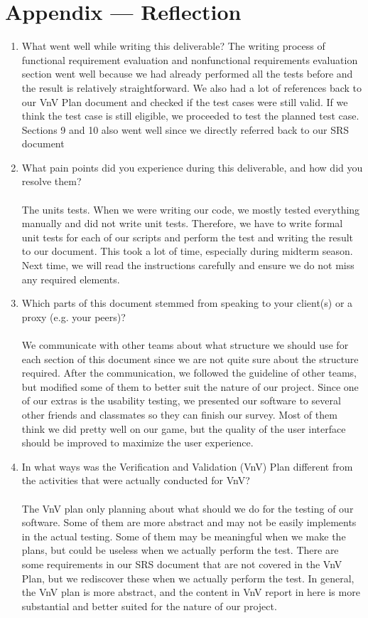 \documentclass[12pt, titlepage]{article}
\begin{document}
\newpage{}





\section{Appendix --- Reflection}

\begin{enumerate}
  \item What went well while writing this deliverable? The writing process of functional requirement evaluation and nonfunctional requirements evaluation section went well because we had already performed all the tests before and the result is relatively straightforward. We also had a lot of references back to our VnV Plan document and checked if the test cases were still valid. If we think the test case is still eligible, we proceeded to test the planned test case. Sections 9 and 10 also went well since we directly referred back to our SRS document
  \item What pain points did you experience during this deliverable, and how did you resolve them?\\\\
  The units tests. When we were writing our code, we mostly tested everything manually and did not write unit tests. Therefore, we have to write formal unit tests for each of our scripts and perform the test and writing the result to our document. This took a lot of time, especially during midterm season. Next time, we will read the instructions carefully and ensure we do not miss any required elements.
  \item Which parts of this document stemmed from speaking to your client(s) or a proxy (e.g. your peers)?\\\\
  We communicate with other teams about what structure we should use for each section of this document since we are not quite sure about the structure required. After the communication, we followed the guideline of other teams, but modified some of them to better suit the nature of our project. Since one of our extras is the usability testing, we presented our software to several other friends and classmates so they can finish our survey. Most of them think we did pretty well on our game, but the quality of the user interface should be improved to maximize the user experience.
  \item In what ways was the Verification and Validation (VnV) Plan different from the activities that were actually conducted for VnV?\\\\
  The VnV plan only planning about what should we do for the testing of our software. Some of them are more abstract and may not be easily implements in the actual testing. Some of them may be meaningful when we make the plans, but could be useless when we actually perform the test. There are some requirements in our SRS document that are not covered in the VnV Plan, but we rediscover these when we actually perform the test. In general, the VnV plan is more abstract, and the content in VnV report in here is more substantial and better suited for the nature of our project.
\end{enumerate}
\end{document}
